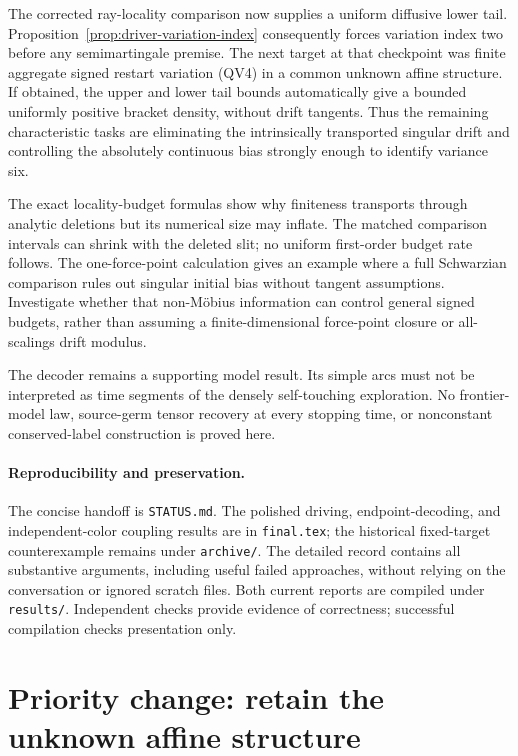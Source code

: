 \documentclass[11pt]{article}
\theoremstyle{definition}\newtheorem{definition}[theorem]{Definition}
\theoremstyle{remark}\newtheorem{remark}[theorem]{Remark}
\begin{document}
The corrected ray-locality comparison now supplies a uniform diffusive
lower tail. Proposition~\ref{prop:driver-variation-index} consequently
forces variation index two before any semimartingale premise.
The next target at that checkpoint was finite aggregate signed restart variation
(QV4) in a common unknown affine structure. If obtained, the upper and
lower tail bounds automatically give a bounded uniformly positive bracket
density, without drift tangents. Thus the remaining characteristic tasks
are eliminating the intrinsically transported singular drift and controlling
the absolutely continuous bias strongly enough to identify variance six.

The exact locality-budget formulas show why finiteness transports through
analytic deletions but its numerical size may inflate. The matched
comparison intervals can shrink with the deleted slit; no uniform
first-order budget rate follows. The one-force-point calculation gives
an example where a full Schwarzian comparison rules out singular initial
bias without tangent assumptions. Investigate whether that non-M\"obius
information can control general signed budgets, rather than assuming a
finite-dimensional force-point closure or all-scalings drift modulus.

The decoder remains a supporting model result. Its simple arcs must not
be interpreted as time segments of the densely self-touching exploration.
No frontier-model law, source-germ tensor recovery at every stopping time,
or nonconstant conserved-label construction is proved here.

\paragraph{Reproducibility and preservation.}
The concise handoff is \texttt{STATUS.md}. The polished driving,
endpoint-decoding, and independent-color coupling results are in
\texttt{final.tex}; the historical fixed-target counterexample remains
under \texttt{archive/}. The detailed record contains all substantive
arguments, including useful failed approaches, without relying on the
conversation or ignored scratch files. Both current reports are compiled
under \texttt{results/}. Independent checks provide evidence of correctness;
successful compilation checks presentation only.


\section{Priority change: retain the unknown affine structure}
\label{sec:affine-priority-29oct}
\end{document}
